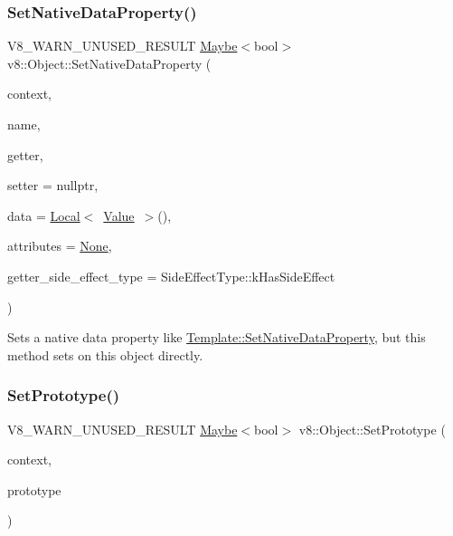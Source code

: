 \subsubsection{\texorpdfstring{Set\+Native\+Data\+Property()}{SetNativeDataProperty()}}
{\footnotesize\ttfamily V8\+\_\+\+W\+A\+R\+N\+\_\+\+U\+N\+U\+S\+E\+D\+\_\+\+R\+E\+S\+U\+LT \mbox{\hyperlink{classv8_1_1Maybe}{Maybe}}$<$bool$>$ v8\+::\+Object\+::\+Set\+Native\+Data\+Property (\begin{DoxyParamCaption}\item[{\mbox{\hyperlink{classv8_1_1Local}{Local}}$<$ \mbox{\hyperlink{classv8_1_1Context}{Context}} $>$}]{context,  }\item[{\mbox{\hyperlink{classv8_1_1Local}{Local}}$<$ \mbox{\hyperlink{classv8_1_1Name}{Name}} $>$}]{name,  }\item[{Accessor\+Name\+Getter\+Callback}]{getter,  }\item[{Accessor\+Name\+Setter\+Callback}]{setter = {\ttfamily nullptr},  }\item[{\mbox{\hyperlink{classv8_1_1Local}{Local}}$<$ \mbox{\hyperlink{classv8_1_1Value}{Value}} $>$}]{data = {\ttfamily \mbox{\hyperlink{classv8_1_1Local}{Local}}$<$~\mbox{\hyperlink{classv8_1_1Value}{Value}}~$>$()},  }\item[{\mbox{\hyperlink{namespacev8_a05f25f935e108a1ea2d150e274602b87}{Property\+Attribute}}}]{attributes = {\ttfamily \mbox{\hyperlink{namespacev8_a05f25f935e108a1ea2d150e274602b87a7ab4d58719c33b3ea2dfaefa29b111df}{None}}},  }\item[{\mbox{\hyperlink{namespacev8_a29711319c2b9fc7716d65faee2f7b9cb}{Side\+Effect\+Type}}}]{getter\+\_\+side\+\_\+effect\+\_\+type = {\ttfamily SideEffectType\+:\+:kHasSideEffect} }\end{DoxyParamCaption})}

Sets a native data property like \mbox{\hyperlink{classv8_1_1Template_af6820f70079745cef28d5291ff21df29}{Template\+::\+Set\+Native\+Data\+Property}}, but this method sets on this object directly. \mbox{\label{classv8_1_1Object_a1f1fc25d2a440ad2a8b7d94db04f88fb}} 
\subsubsection{\texorpdfstring{Set\+Prototype()}{SetPrototype()}}
{\footnotesize\ttfamily V8\+\_\+\+W\+A\+R\+N\+\_\+\+U\+N\+U\+S\+E\+D\+\_\+\+R\+E\+S\+U\+LT \mbox{\hyperlink{classv8_1_1Maybe}{Maybe}}$<$bool$>$ v8\+::\+Object\+::\+Set\+Prototype (\begin{DoxyParamCaption}\item[{\mbox{\hyperlink{classv8_1_1Local}{Local}}$<$ \mbox{\hyperlink{classv8_1_1Context}{Context}} $>$}]{context,  }\item[{\mbox{\hyperlink{classv8_1_1Local}{Local}}$<$ \mbox{\hyperlink{classv8_1_1Value}{Value}} $>$}]{prototype }\end{DoxyParamCaption})}

